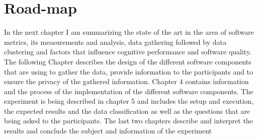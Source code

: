 \section{Road-map}
In the next chapter I am summarizing the state of the art in the area of software metrics, its measurements and analysis, data gathering followed by data clustering and factors that influence cognitive performance and software quality.\\
The following Chapter describes the design of the different software components that are using to gather the data, provide information to the participants and to ensure the privacy of the gathered information. 
Chapter 4 contains information and the process of the implementation of the different software components. 
The experiment is being described in chapter 5 and includes the setup and execution, the expected results and the data classification as well as the questions that are being asked to the participants. 
The last two chapters describe and interpret the results and conclude the subject and information of the experiment

